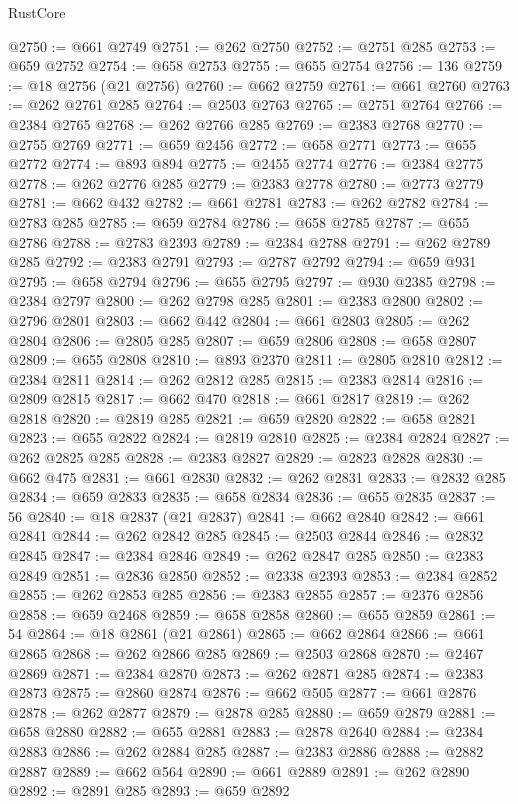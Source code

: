 \begin{lexlean}{RustCore}
\begin{coremodule}
@2750 := @661 @2749
@2751 := @262 @2750
@2752 := @2751 @285
@2753 := @659 @2752
@2754 := @658 @2753
@2755 := @655 @2754
@2756 := 136
@2759 := @18 @2756 (@21 @2756)
@2760 := @662 @2759
@2761 := @661 @2760
@2763 := @262 @2761 @285
@2764 := @2503 @2763
@2765 := @2751 @2764
@2766 := @2384 @2765
@2768 := @262 @2766 @285
@2769 := @2383 @2768
@2770 := @2755 @2769
@2771 := @659 @2456
@2772 := @658 @2771
@2773 := @655 @2772
@2774 := @893 @894
@2775 := @2455 @2774
@2776 := @2384 @2775
@2778 := @262 @2776 @285
@2779 := @2383 @2778
@2780 := @2773 @2779
@2781 := @662 @432
@2782 := @661 @2781
@2783 := @262 @2782
@2784 := @2783 @285
@2785 := @659 @2784
@2786 := @658 @2785
@2787 := @655 @2786
@2788 := @2783 @2393
@2789 := @2384 @2788
@2791 := @262 @2789 @285
@2792 := @2383 @2791
@2793 := @2787 @2792
@2794 := @659 @931
@2795 := @658 @2794
@2796 := @655 @2795
@2797 := @930 @2385
@2798 := @2384 @2797
@2800 := @262 @2798 @285
@2801 := @2383 @2800
@2802 := @2796 @2801
@2803 := @662 @442
@2804 := @661 @2803
@2805 := @262 @2804
@2806 := @2805 @285
@2807 := @659 @2806
@2808 := @658 @2807
@2809 := @655 @2808
@2810 := @893 @2370
@2811 := @2805 @2810
@2812 := @2384 @2811
@2814 := @262 @2812 @285
@2815 := @2383 @2814
@2816 := @2809 @2815
@2817 := @662 @470
@2818 := @661 @2817
@2819 := @262 @2818
@2820 := @2819 @285
@2821 := @659 @2820
@2822 := @658 @2821
@2823 := @655 @2822
@2824 := @2819 @2810
@2825 := @2384 @2824
@2827 := @262 @2825 @285
@2828 := @2383 @2827
@2829 := @2823 @2828
@2830 := @662 @475
@2831 := @661 @2830
@2832 := @262 @2831
@2833 := @2832 @285
@2834 := @659 @2833
@2835 := @658 @2834
@2836 := @655 @2835
@2837 := 56
@2840 := @18 @2837 (@21 @2837)
@2841 := @662 @2840
@2842 := @661 @2841
@2844 := @262 @2842 @285
@2845 := @2503 @2844
@2846 := @2832 @2845
@2847 := @2384 @2846
@2849 := @262 @2847 @285
@2850 := @2383 @2849
@2851 := @2836 @2850
@2852 := @2338 @2393
@2853 := @2384 @2852
@2855 := @262 @2853 @285
@2856 := @2383 @2855
@2857 := @2376 @2856
@2858 := @659 @2468
@2859 := @658 @2858
@2860 := @655 @2859
@2861 := 54
@2864 := @18 @2861 (@21 @2861)
@2865 := @662 @2864
@2866 := @661 @2865
@2868 := @262 @2866 @285
@2869 := @2503 @2868
@2870 := @2467 @2869
@2871 := @2384 @2870
@2873 := @262 @2871 @285
@2874 := @2383 @2873
@2875 := @2860 @2874
@2876 := @662 @505
@2877 := @661 @2876
@2878 := @262 @2877
@2879 := @2878 @285
@2880 := @659 @2879
@2881 := @658 @2880
@2882 := @655 @2881
@2883 := @2878 @2640
@2884 := @2384 @2883
@2886 := @262 @2884 @285
@2887 := @2383 @2886
@2888 := @2882 @2887
@2889 := @662 @564
@2890 := @661 @2889
@2891 := @262 @2890
@2892 := @2891 @285
@2893 := @659 @2892

\end{coremodule}
\end{lexlean}

